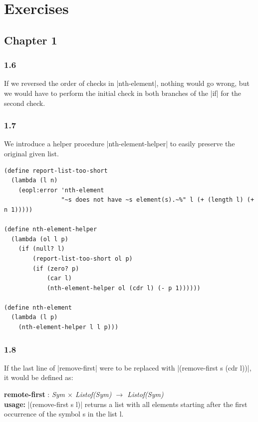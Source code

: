 \documentclass[a4paper]{article}
\begin{document}
\newpage

\section{Exercises}

\subsection{Chapter 1}

\subsubsection*{1.6}

If we reversed the order of checks in |nth-element|, nothing would go wrong, but we would have to perform the initial check in both branches of the |if| for the second check.

\subsubsection*{1.7}

We introduce a helper procedure |nth-element-helper| to easily preserve the original given list.

\begin{lstlisting}
(define report-list-too-short
  (lambda (l n)
    (eopl:error 'nth-element
                "~s does not have ~s element(s).~%" l (+ (length l) (+ n 1)))))

(define nth-element-helper
  (lambda (ol l p)
    (if (null? l)
        (report-list-too-short ol p)
        (if (zero? p)
            (car l)
            (nth-element-helper ol (cdr l) (- p 1))))))

(define nth-element
  (lambda (l p)
    (nth-element-helper l l p)))
\end{lstlisting}

\subsubsection*{1.8}

If the last line of |remove-first| were to be replaced with |(remove-first s (cdr l))|, it would be defined as:

\textbf{remote-first} : \textit{Sym $\times$ Listof(Sym) $\rightarrow$ Listof(Sym)}\\
\textbf{usage:} |(remove-first s l)| returns a list with all elements starting after the first occurrence of the symbol s in the list l.
\end{document}
